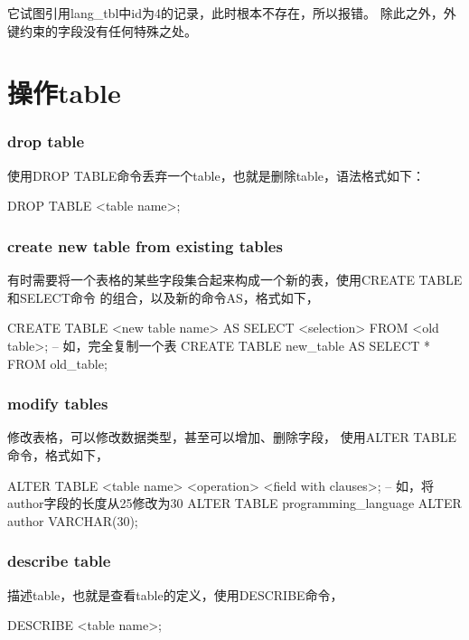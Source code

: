 \documentclass[a4paper,11pt]{article}
\begin{document}
它试图引用lang\_tbl中id为4的记录，此时根本不存在，所以报错。
除此之外，外键约束的字段没有任何特殊之处。

\part[操作table]{操作table}
\section[drop table]{drop table}
使用DROP TABLE命令丢弃一个table，也就是删除table，语法格式如下：

\begin{sqlcode}
DROP TABLE <table name>;
\end{sqlcode}

\section[create new table from existing tables]{create new table from existing tables}
有时需要将一个表格的某些字段集合起来构成一个新的表，使用CREATE TABLE和SELECT命令
的组合，以及新的命令AS，格式如下，

\begin{sqlcode}
CREATE TABLE <new table name> AS SELECT <selection> FROM <old table>;
-- 如，完全复制一个表
CREATE TABLE new_table AS SELECT * FROM old_table;
\end{sqlcode}

\section[modify tables]{modify tables}
修改表格，可以修改数据类型，甚至可以增加、删除字段，
使用ALTER TABLE命令，格式如下，

\begin{sqlcode}
ALTER TABLE <table name> <operation> <field with clauses>;
-- 如，将author字段的长度从25修改为30
ALTER TABLE programming_language ALTER author VARCHAR(30);
\end{sqlcode}

\section[describe table]{describe table}
描述table，也就是查看table的定义，使用DESCRIBE命令，

\begin{sqlcode}
DESCRIBE <table name>;
\end{sqlcode}
\end{document}
